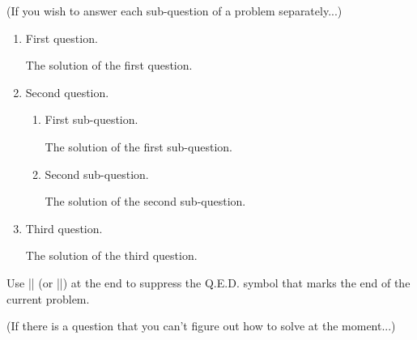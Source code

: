 \documentclass[11pt,
  logo = {example-image},
  title in boldface,
  theorem in new line,
]{homework}
\begin{document}
\bigskip\textcolor{gray!55}{(If you wish to answer each sub-question of a problem separately...)}

\begin{problem}
    \begin{enumerate}[itemsep=.5\baselineskip]
        \item First question.

        \begin{solution}
            The solution of the first question.
        \end{solution}

        \item Second question.

        \begin{enumerate}[itemsep=.3\baselineskip]
            \item First sub-question.

            \begin{solution}
                The solution of the first sub-question.
            \end{solution}

            \item Second sub-question.

            \begin{solution}
                The solution of the second sub-question.
            \end{solution}

        \end{enumerate}

        \item Third question.

        \begin{solution}
            The solution of the third question.
        \end{solution}

    \end{enumerate}
    Use \cverb|\noqed| (or \cverb|\noQED|) at the end to suppress the Q.E.D. symbol that marks the end of the current problem.
    \noQED
\end{problem}


\bigskip\textcolor{gray!55}{(If there is a question that you can't figure out how to solve at the moment...)}

\end{document}
